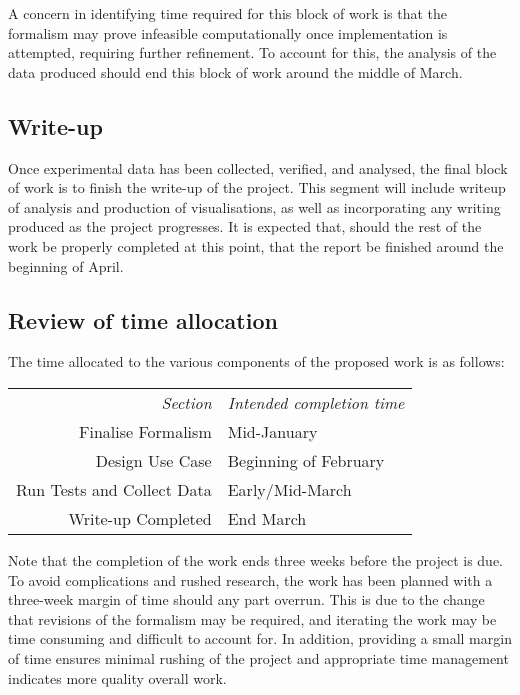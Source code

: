 A concern in identifying time required for this block of work is that the formalism may prove infeasible computationally once implementation is attempted, requiring further refinement. To account for this, the analysis of the data produced should end this block of work around the middle of March.\par

\subsection{Write-up}
Once experimental data has been collected, verified, and analysed, the final block of work is to finish the write-up of the project. This segment will include writeup of analysis and production of visualisations, as well as incorporating any writing produced as the project progresses. It is expected that, should the rest of the work be properly completed at this point, that the report be finished around the beginning of April.\par

\subsection{Review of time allocation}
The time allocated to the various components of the proposed work is as follows:\\
\begin{tabular}{r|l}
    \emph{Section} & \emph{Intended completion time}\\
    Finalise Formalism & Mid-January\\
    Design Use Case & Beginning of February\\
    Run Tests and Collect Data & Early/Mid-March\\
    Write-up Completed & End March\\
\end{tabular}\par

Note that the completion of the work ends three weeks before the project is due. To avoid complications and rushed research, the work has been planned with a three-week margin of time should any part overrun. This is due to the change that revisions of the formalism may be required, and iterating the work may be time consuming and difficult to account for. In addition, providing a small margin of time ensures minimal rushing of the project and appropriate time management indicates more quality overall work.\par
